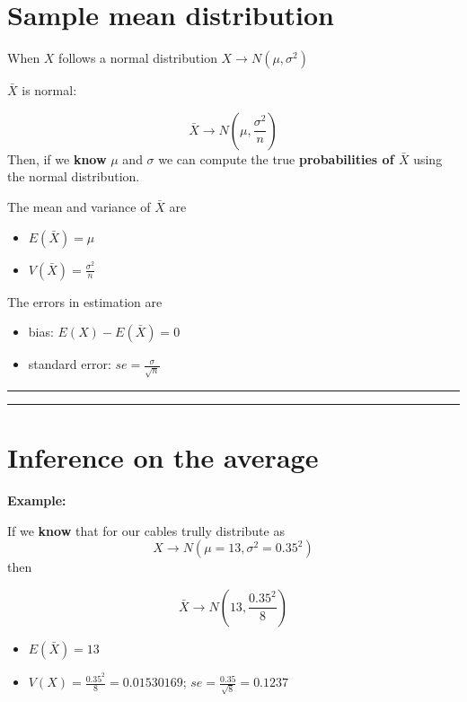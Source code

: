\documentclass[
]{book}
\providecommand{\tightlist}{%
  \setlength{\itemsep}{0pt}\setlength{\parskip}{0pt}}
\begin{document}
\hypertarget{sample-mean-distribution}{%
\section{Sample mean distribution}\label{sample-mean-distribution}}

When \(X\) follows a normal distribution \(X \rightarrow N(\mu, \sigma^2)\)

\(\bar{X}\) is normal:

\[\bar{X} \rightarrow N(\mu, \frac{\sigma^2}{n})\]
Then, if we \textbf{know} \(\mu\) and \(\sigma\) we can compute the true \textbf{probabilities of \(\bar{X}\)} using the normal distribution.

The mean and variance of \(\bar{X}\) are

\begin{itemize}
\tightlist
\item
  \(E(\bar{X})=\mu\)
\item
  \(V(\bar{X})=\frac{\sigma^2}{n}\)
\end{itemize}

The errors in estimation are

\begin{itemize}
\tightlist
\item
  bias: \(E(X)-E(\bar{X})=0\)
\item
  standard error: \(se= \frac{\sigma}{\sqrt{n}}\)
\end{itemize}

\begin{center}\rule{0.5\linewidth}{0.5pt}\end{center}

\begin{center}\rule{0.5\linewidth}{0.5pt}\end{center}

\hypertarget{inference-on-the-average}{%
\section{Inference on the average}\label{inference-on-the-average}}

\textbf{Example:}

If we \textbf{know} that for our cables trully distribute as \[X \rightarrow N(\mu=13, \sigma^2=0.35^2)\] then

\[\bar{X} \rightarrow N(13, \frac{0.35^2}{8})\]

\begin{itemize}
\tightlist
\item
  \(E(\bar{X})=13\)
\item
  \(V(X)=\frac{0.35^2}{8}=0.01530169\); \(se=\frac{0.35}{\sqrt{8}}=0.1237\)
\end{itemize}
\end{document}
